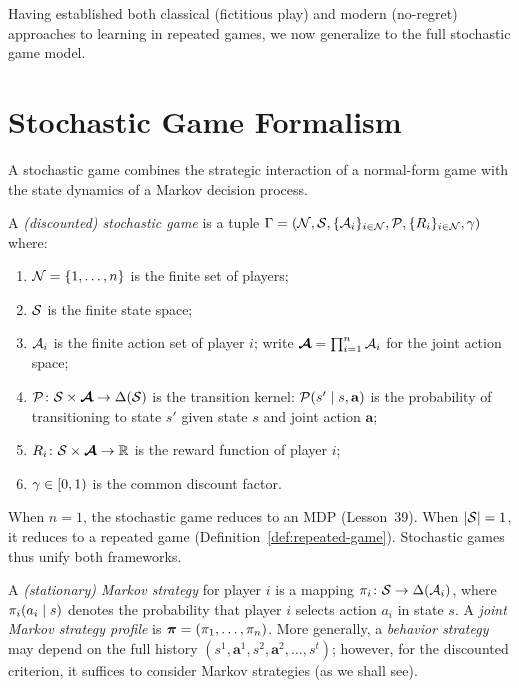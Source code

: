 \documentclass[11pt,a4paper]{article}
\begin{document}
Having established both classical (fictitious play) and modern
(no-regret) approaches to learning in repeated games, we now
generalize to the full stochastic game model.

\section{Stochastic Game Formalism}
\label{sec:stochastic-games}

A stochastic game combines the strategic interaction of a normal-form
game with the state dynamics of a Markov decision process.

\begin{definition}
\label{def:stochastic-game}
A \emph{(discounted) stochastic game} is a tuple
$\Gamma = (\mathcal{N}, \mathcal{S}, \{\mathcal{A}_i\}_{i \in \mathcal{N}},
\mathcal{P}, \{R_i\}_{i \in \mathcal{N}}, \gamma)$ where:
\begin{enumerate}[nosep]
  \item $\mathcal{N} = \{1, \ldots, n\}$ is the finite set of players;
  \item $\mathcal{S}$ is the finite state space;
  \item $\mathcal{A}_i$ is the finite action set of player $i$;
    write $\boldsymbol{\mathcal{A}} = \prod_{i=1}^n \mathcal{A}_i$ for the joint
    action space;
  \item $\mathcal{P} \colon \mathcal{S} \times \boldsymbol{\mathcal{A}} \to
    \Delta(\mathcal{S})$ is the transition kernel:
    $\mathcal{P}(s' \mid s, \mathbf{a})$ is the probability of
    transitioning to state $s'$ given state $s$ and joint action
    $\mathbf{a}$;
  \item $R_i \colon \mathcal{S} \times \boldsymbol{\mathcal{A}} \to \mathbb{R}$ is the
    reward function of player $i$;
  \item $\gamma \in [0, 1)$ is the common discount factor.
\end{enumerate}
\end{definition}

\begin{remark}
When $n = 1$, the stochastic game reduces to an MDP (Lesson~39).
When $|\mathcal{S}| = 1$, it reduces to a repeated game
(Definition~\ref{def:repeated-game}).  Stochastic games thus
unify both frameworks.
\end{remark}

\begin{definition}
\label{def:markov-strategy}
A \emph{(stationary) Markov strategy} for player $i$ is a mapping
$\pi_i \colon \mathcal{S} \to \Delta(\mathcal{A}_i)$, where
$\pi_i(a_i \mid s)$ denotes the probability that player $i$
selects action $a_i$ in state $s$.  A \emph{joint Markov strategy
profile} is $\boldsymbol{\pi} = (\pi_1, \ldots, \pi_n)$.  More
generally, a \emph{behavior strategy} may depend on the full history
$(s^1, \mathbf{a}^1, s^2, \mathbf{a}^2, \ldots, s^t)$; however, for
the discounted criterion, it suffices to consider Markov strategies
(as we shall see).
\end{definition}
\end{document}
